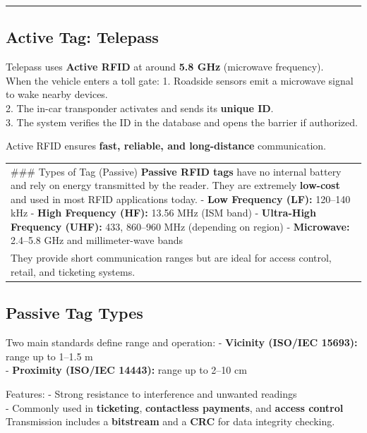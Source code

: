 \documentclass[a4paper, 12pt]{book} %
\begin{document}
\begin{center}\rule{0.5\linewidth}{0.5pt}\end{center}

\subsection{Active Tag: Telepass}\label{active-tag-telepass}

Telepass uses \textbf{Active RFID} at around \textbf{5.8 GHz} (microwave
frequency).\\
When the vehicle enters a toll gate: 1. Roadside sensors emit a
microwave signal to wake nearby devices.\\
2. The in-car transponder activates and sends its \textbf{unique ID}.\\
3. The system verifies the ID in the database and opens the barrier if
authorized.

Active RFID ensures \textbf{fast, reliable, and long-distance}
communication.

\begin{longtable}[]{@{}
  >{\raggedright\arraybackslash}p{}@{}}
\toprule\noalign{}
\endhead
\bottomrule\noalign{}
\endlastfoot
\#\#\# Types of Tag (Passive) \textbf{Passive RFID tags} have no
internal battery and rely on energy transmitted by the reader. They are
extremely \textbf{low-cost} and used in most RFID applications today. -
\textbf{Low Frequency (LF):} 120--140 kHz - \textbf{High Frequency
(HF):} 13.56 MHz (ISM band) - \textbf{Ultra-High Frequency (UHF):} 433,
860--960 MHz (depending on region) - \textbf{Microwave:} 2.4--5.8 GHz
and millimeter-wave bands \\
They provide short communication ranges but are ideal for access
control, retail, and ticketing systems. \\
\end{longtable}

\subsection{Passive Tag Types}\label{passive-tag-types}

Two main standards define range and operation: - \textbf{Vicinity
(ISO/IEC 15693):} range up to 1--1.5 m\\
- \textbf{Proximity (ISO/IEC 14443):} range up to 2--10 cm

Features: - Strong resistance to interference and unwanted readings\\
- Commonly used in \textbf{ticketing}, \textbf{contactless payments},
and \textbf{access control}\\
Transmission includes a \textbf{bitstream} and a \textbf{CRC} for data
integrity checking.
\end{document}
